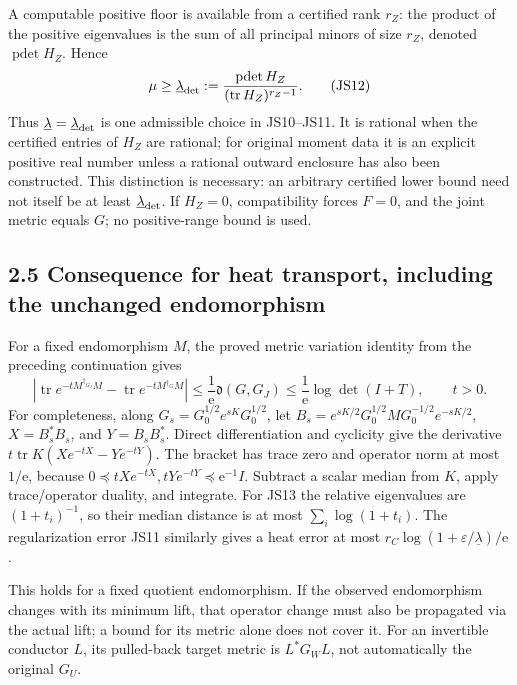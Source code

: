 \documentclass[
  11pt,
]{article}
\begin{document}
A computable positive floor is available from a certified rank \(r_Z\):
the product of the positive eigenvalues is the sum of all principal
minors of size \(r_Z\), denoted \(\operatorname{pdet}H_Z\). Hence \[
\mu\ge\underline\lambda_{\rm det}:=
\frac{\operatorname{pdet}H_Z}{(\operatorname{tr}H_Z)^{r_Z-1}}.
\tag{JS12}
\] Thus \(\underline\lambda=\underline\lambda_{\rm det}\) is one
admissible choice in JS10--JS11. It is rational when the certified
entries of \(H_Z\) are rational; for original moment data it is an
explicit positive real number unless a rational outward enclosure has
also been constructed. This distinction is necessary: an arbitrary
certified lower bound need not itself be at least
\(\underline\lambda_{\rm det}\). If \(H_Z=0\), compatibility forces
\(F=0\), and the joint metric equals \(G\); no positive-range bound is
used.

\subsection{2.5 Consequence for heat transport, including the unchanged
endomorphism}\label{consequence-for-heat-transport-including-the-unchanged-endomorphism}

For a fixed endomorphism \(M\), the proved metric variation identity
from the preceding continuation gives \[
|\operatorname{tr}e^{-tM^{\dagger_{G_J}}M}
-\operatorname{tr}e^{-tM^{\dagger_G}M}|
\le\frac1{\mathrm e}\mathfrak d(G,G_J)
\le\frac1{\mathrm e}\log\det(I+T),\qquad t>0.
\tag{JS13}
\] For completeness, along \(G_s=G_0^{1/2}e^{sK}G_0^{1/2}\), let
\(B_s=e^{sK/2}G_0^{1/2}MG_0^{-1/2}e^{-sK/2}\), \(X=B_s^*B_s\), and
\(Y=B_sB_s^*\). Direct differentiation and cyclicity give the derivative
\(t\operatorname{tr}K(Xe^{-tX}-Ye^{-tY})\). The bracket has trace zero
and operator norm at most \(1/\mathrm e\), because
\(0\preceq tXe^{-tX},tYe^{-tY}\preceq\mathrm e^{-1}I\). Subtract a
scalar median from \(K\), apply trace/operator duality, and integrate.
For JS13 the relative eigenvalues are \((1+t_i)^{-1}\), so their median
distance is at most \(\sum_i\log(1+t_i)\). The regularization error JS11
similarly gives a heat error at most
\(r_C\log(1+\varepsilon/\underline\lambda)/\mathrm e\).

This holds for a fixed quotient endomorphism. If the observed
endomorphism changes with its minimum lift, that operator change must
also be propagated via the actual lift; a bound for its metric alone
does not cover it. For an invertible conductor \(L\), its pulled-back
target metric is \(L^*G_WL\), not automatically the original \(G_U\).
\end{document}
